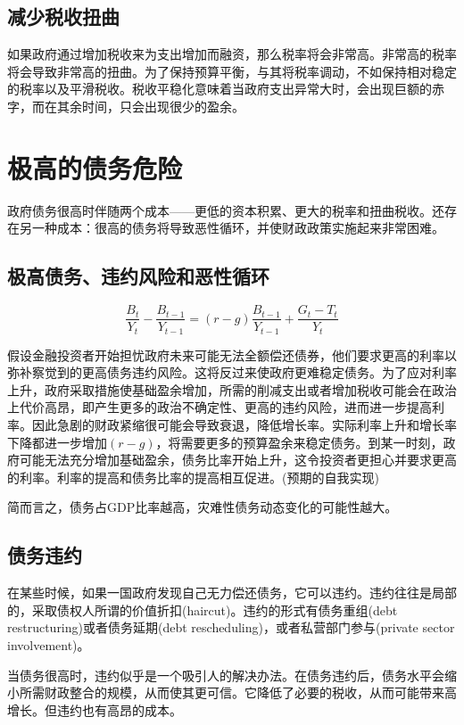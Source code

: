 \documentclass{article}
\begin{document}
\subsection{减少税收扭曲}

如果政府通过增加税收来为支出增加而融资，那么税率将会非常高。非常高的税率将会导致非常高的扭曲。为了保持预算平衡，与其将税率调动，不如保持相对稳定的税率以及平滑税收。税收平稳化意味着当政府支出异常大时，会出现巨额的赤字，而在其余时间，只会出现很少的盈余。

\section{极高的债务危险}

政府债务很高时伴随两个成本——更低的资本积累、更大的税率和扭曲税收。还存在另一种成本：很高的债务将导致恶性循环，并使财政政策实施起来非常困难。

\subsection{极高债务、违约风险和恶性循环}

\[
\frac{B_t}{Y_t}-\frac{B_{t-1}}{Y_{t-1}}=(r-g)\frac{B_{t-1}}{Y_{t-1}}+\frac{G_t-T_t}{Y_t}
\]

假设金融投资者开始担忧政府未来可能无法全额偿还债券，他们要求更高的利率以弥补察觉到的更高债务违约风险。这将反过来使政府更难稳定债务。为了应对利率上升，政府采取措施使基础盈余增加，所需的削减支出或者增加税收可能会在政治上代价高昂，即产生更多的政治不确定性、更高的违约风险，进而进一步提高利率。因此急剧的财政紧缩很可能会导致衰退，降低增长率。实际利率上升和增长率下降都进一步增加$ (r-g) $，将需要更多的预算盈余来稳定债务。到某一时刻，政府可能无法充分增加基础盈余，债务比率开始上升，这令投资者更担心并要求更高的利率。利率的提高和债务比率的提高相互促进。(预期的自我实现)

简而言之，债务占GDP比率越高，灾难性债务动态变化的可能性越大。

\subsection{债务违约}

在某些时候，如果一国政府发现自己无力偿还债务，它可以违约。违约往往是局部的，采取债权人所谓的价值折扣(haircut)。违约的形式有债务重组(debt restructuring)或者债务延期(debt rescheduling)，或者私营部门参与(private sector involvement)。

当债务很高时，违约似乎是一个吸引人的解决办法。在债务违约后，债务水平会缩小所需财政整合的规模，从而使其更可信。它降低了必要的税收，从而可能带来高增长。但违约也有高昂的成本。
\end{document}
